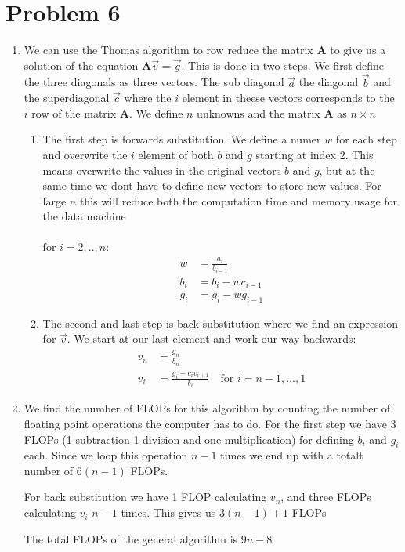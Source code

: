 \documentclass[english,notitlepage]{revtex4-1}  %
\begin{document}
\section*{Problem 6}
\begin{enumerate}[label= \alph*)]
  \item We can use the Thomas algorithm to row reduce the matrix $\boldsymbol{A}$ to give us a solution of the equation $\boldsymbol{A} \vec{v} = \vec{g}$. This is done in two steps. We first define the three diagonals as three vectors. The sub diagonal $\vec{a}$ the diagonal $\vec{b}$ and the superdiagonal $\vec{c}$ where the $i$ element in theese vectors corresponds to the $i$ row of the matrix $\boldsymbol{A}$. We define $n$ unknowns and the matrix $\boldsymbol{A}$ as $n\times n$
  \begin{enumerate}[label=\roman*)]
    \item The first step is forwards substitution. We define a numer $w$ for each step and overwrite the $i$ element of both $b$ and $g$ starting at index 2. This means overwrite the values in the original vectors $b$ and $g$, but at the same time we dont have to define new vectors to store new values. For large $n$ this will reduce both the computation time and memory usage for the data machine\\\\
    $\text{for }i=2,..,n$:
    \begin{align*}
      w &= \frac{a_i}{b_{i-1}} \\
      b_i &= b_i - wc_{i-1} \\
      g_i &= g_i - wg_{i-1}
    \end{align*}
    \item The second and last step is back substitution where we find an expression for $\vec{v}$. We start at our last element and work our way backwards:
    \begin{align*}
      v_n &= \frac{g_n}{b_n} \\
      v_i &= \frac{g_i - c_i v_ {i+1}}{b_i} \quad \text{for } i = n-1,...,1
    \end{align*}
  \end{enumerate}
  \item We find the number of FLOPs for this algorithm by counting the number of floating point operations the computer has to do. For the first step we have 3 FLOPs (1 subtraction 1 division and one multiplication) for defining $b_i$ and  $g_i$ each. Since we loop this operation $n-1$ times we end up with a  totalt number of $6(n-1)$ FLOPs.

  For back substitution we have 1 FLOP calculating $v_n$, and three FLOPs calculating $v_i$ $n-1$ times. This gives us $3(n-1)+1$ FLOPs

  The total FLOPs of the general algorithm is $9n-8$
\end{enumerate}
\end{document}
